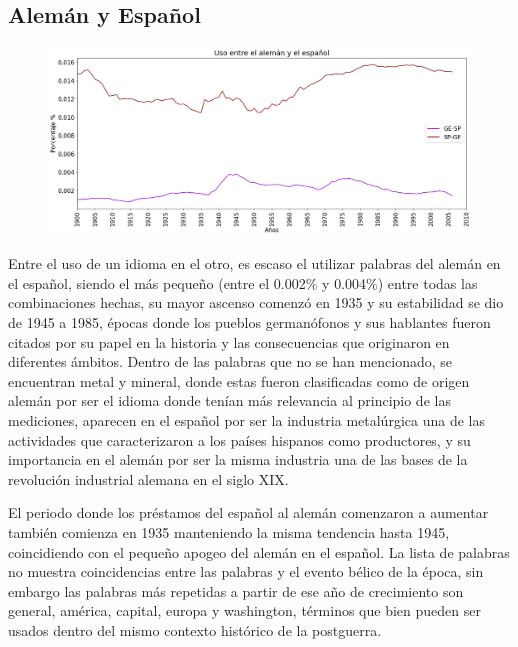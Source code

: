 \newpage
\subsection{Alemán y Español}

\begin{figure}[h!]
	\centering
	\includegraphics[scale=.38]{Cap_3/SF_4_S2_GE.png}
	\label{SF_GS}
	\caption{}
\end{figure}

Entre el uso de un idioma en el otro,  es escaso el utilizar palabras del alemán en el español, siendo el más pequeño  (entre el 0.002$\%$ y 0.004$\%$) entre todas las combinaciones hechas, su mayor ascenso comenzó en 1935 y su estabilidad se dio de 1945 a 1985,  épocas donde los pueblos germanófonos y sus hablantes  fueron citados por su papel en la historia y las consecuencias que originaron en diferentes ámbitos.  Dentro de las palabras que no se han mencionado, se encuentran metal y mineral,  donde estas fueron clasificadas como de origen alemán por ser el idioma donde tenían más relevancia al principio de las mediciones, aparecen en el español  por ser  la industria metalúrgica una de las actividades que caracterizaron a los países hispanos como productores, y su importancia en el alemán por ser la misma industria una de las bases de la revolución industrial alemana en el siglo XIX. 

El periodo donde los préstamos del español al alemán comenzaron a aumentar también comienza en 1935  manteniendo la misma tendencia hasta 1945,  coincidiendo con el pequeño apogeo del alemán en el español.  La lista de palabras no muestra coincidencias entre las palabras y el evento bélico de la época, sin embargo las palabras más repetidas a partir de ese año de crecimiento son  general, américa, capital, europa y washington, términos que bien pueden ser usados dentro del mismo contexto histórico de la postguerra. 




